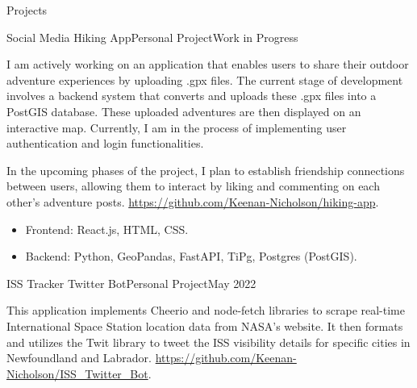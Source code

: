 \documentclass[]{Keenan-Nicholson-Resume}
\begin{document}
\begin{section}{Projects}
\begin{subsectionnobullet}{Social Media Hiking App}{Personal Project}{Work in Progress}{}
    \item{I am actively working on an application that enables users to share their outdoor adventure experiences by uploading .gpx files. The current stage of development involves a backend system that converts and uploads these .gpx files into a PostGIS database. These uploaded adventures are then displayed on an interactive map. Currently, I am in the process of implementing user authentication and login functionalities.

    In the upcoming phases of the project, I plan to establish friendship connections between users, allowing them to interact by liking and commenting on each other's adventure posts. \href{https://github.com/Keenan-Nicholson/hiking-app}{https://github.com/Keenan-Nicholson/hiking-app}.}
        \vspace{-4pt}
        \begin{itemize}[itemsep=-6.5pt]
            \item Frontend: React.js, HTML, CSS.
            \item Backend: Python, GeoPandas, FastAPI, TiPg, Postgres (PostGIS).
        \end{itemize}
\end{subsectionnobullet}

\begin{subsectionnobullet}{ISS Tracker Twitter Bot}{Personal Project}{May 2022}{}
    \item{This application implements Cheerio and node-fetch libraries to scrape real-time International Space Station location data from NASA's website. It then formats and utilizes the Twit library to tweet the ISS visibility details for specific cities in Newfoundland and Labrador. \href{https:\\github.com/Keenan-Nicholson/ISS_Twitter_Bot}{https://github.com/Keenan-Nicholson/ISS\_Twitter\_Bot}.}
\end{subsectionnobullet}

\end{section}

\end{document}
